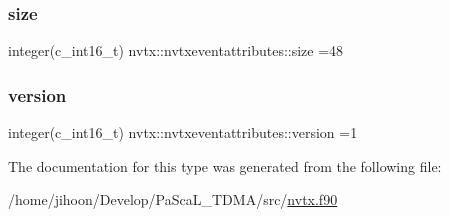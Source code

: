 \subsubsection{\texorpdfstring{size}{size}}
{\footnotesize\ttfamily integer(c\+\_\+int16\+\_\+t) nvtx\+::nvtxeventattributes\+::size =48}

\mbox{\label{structnvtx_1_1nvtxeventattributes_a3e1c1186627d3585041f5107f7a2c6cf}} 
\subsubsection{\texorpdfstring{version}{version}}
{\footnotesize\ttfamily integer(c\+\_\+int16\+\_\+t) nvtx\+::nvtxeventattributes\+::version =1}



The documentation for this type was generated from the following file\+:\begin{DoxyCompactItemize}
\item 
/home/jihoon/\+Develop/\+Pa\+Sca\+L\+\_\+\+T\+D\+M\+A/src/\hyperlink{nvtx_8f90}{nvtx.\+f90}\end{DoxyCompactItemize}

